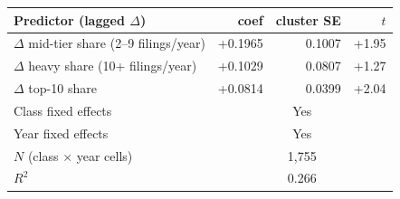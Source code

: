 \begin{tabular}{lrrr}
\toprule
Predictor (lagged $\Delta$) & coef & cluster SE & $t$ \\
\midrule
  $\Delta$ mid-tier share (2--9 filings/year)   & +0.1965 & 0.1007 & +1.95 \\
  $\Delta$ heavy share (10+ filings/year)       & +0.1029 & 0.0807 & +1.27 \\
  $\Delta$ top-10 share                         & +0.0814 & 0.0399 & +2.04 \\
\midrule
  Class fixed effects & \multicolumn{3}{c}{Yes} \\
  Year fixed effects  & \multicolumn{3}{c}{Yes} \\
  $N$ (class $\times$ year cells) & \multicolumn{3}{c}{1,755} \\
  $R^2$  & \multicolumn{3}{c}{0.266} \\
\bottomrule
\end{tabular}